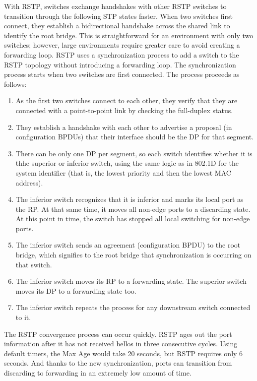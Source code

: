 \documentclass{article}
\begin{document}
With RSTP, switches exchange handshakes with other RSTP switches to transition through the following STP states faster. When two switches first connect, they establish a bidirectional handshake across the shared link to identify the root bridge. This is straightforward for an environment with only two switches; however, large environments require greater care to avoid creating a forwarding loop. RSTP uses a synchronization process to add a switch to the RSTP topology without introducing a forwarding loop. The synchronization process starts when two  switches are first connected. The process proceeds as follows:
	\begin{enumerate}
		\item As the first two switches connect to each other, they verify that they are connected with a point-to-point link by checking the full-duplex status.
		\item They establish a handshake with each other to advertise a proposal (in configuration BPDUs) that their interface should be the DP for that segment.
		\item There can be only one DP per segment, so each switch identifies whether it is thhe superior or inferior switch, using the same logic as in 802.1D for the system identifier (that is, the lowest priority and then the lowest MAC address). 
		\item The inferior switch recognizes that it is inferior and marks its local port as the RP. At that same time, it moves all non-edge ports to a discarding state. At this point in time, the switch has stopped all local switching for non-edge ports.
		\item The inferior switch sends an agreement (configuration BPDU) to the root bridge, which signifies to the root bridge that synchronization is occurring on that switch.
		\item The inferior switch moves its RP to a forwarding state. The superior switch moves its DP to a forwarding state too.
		\item The inferior switch repeats the process for any downstream switch connected to it.
	\end{enumerate}

The RSTP convergence process can occur quickly. RSTP ages out the port information after it has not received hellos in three consecutive cycles. Using default timers, the Max Age would take 20 seconds, but RSTP requires only 6 seconds. And thanks to the new synchronization, ports can transition from discarding to forwarding in an extremely low amount of time.\\
\end{document}
